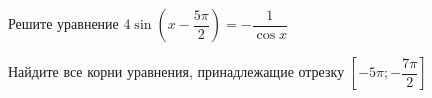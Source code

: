\begin{ex}
	\begin{condition}
		\begin{enumcols}[label=\asbuk*)]
			\item Решите уравнение \( 4\sin{\left(x - \dfrac{5\pi }{2}\right)} =- \dfrac{1}{\cos x}  \)
			\item Найдите все корни уравнения, принадлежащие отрезку \( \left[-5\pi;-\dfrac{7\pi}{2}\right] \)
		\end{enumcols}
	\end{condition}
\end{ex}